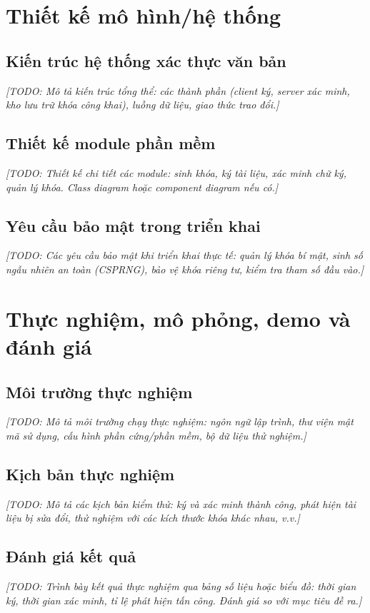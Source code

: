 \documentclass[../DoAn.tex]{subfiles}
\begin{document}
\section{Thiết kế mô hình/hệ thống}
\label{section:2.3}

\subsection{Kiến trúc hệ thống xác thực văn bản}
\label{section:2.3.1}
\textit{[TODO: Mô tả kiến trúc tổng thể: các thành phần (client ký, server xác minh, kho lưu trữ khóa công khai), luồng dữ liệu, giao thức trao đổi.]}

\subsection{Thiết kế module phần mềm}
\label{section:2.3.2}
\textit{[TODO: Thiết kế chi tiết các module: sinh khóa, ký tài liệu, xác minh chữ ký, quản lý khóa. Class diagram hoặc component diagram nếu có.]}

\subsection{Yêu cầu bảo mật trong triển khai}
\label{section:2.3.3}
\textit{[TODO: Các yêu cầu bảo mật khi triển khai thực tế: quản lý khóa bí mật, sinh số ngẫu nhiên an toàn (CSPRNG), bảo vệ khóa riêng tư, kiểm tra tham số đầu vào.]}

\section{Thực nghiệm, mô phỏng, demo và đánh giá}
\label{section:2.4}

\subsection{Môi trường thực nghiệm}
\label{section:2.4.1}
\textit{[TODO: Mô tả môi trường chạy thực nghiệm: ngôn ngữ lập trình, thư viện mật mã sử dụng, cấu hình phần cứng/phần mềm, bộ dữ liệu thử nghiệm.]}

\subsection{Kịch bản thực nghiệm}
\label{section:2.4.2}
\textit{[TODO: Mô tả các kịch bản kiểm thử: ký và xác minh thành công, phát hiện tài liệu bị sửa đổi, thử nghiệm với các kích thước khóa khác nhau, v.v.]}

\subsection{Đánh giá kết quả}
\label{section:2.4.3}
\textit{[TODO: Trình bày kết quả thực nghiệm qua bảng số liệu hoặc biểu đồ: thời gian ký, thời gian xác minh, tỉ lệ phát hiện tấn công. Đánh giá so với mục tiêu đề ra.]}
\end{document}
